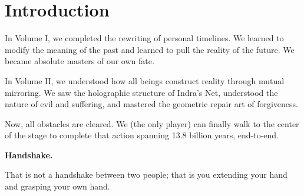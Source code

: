 \section{Introduction}

In Volume I, we completed the rewriting of personal timelines. We learned to modify the meaning of the past and learned to pull the reality of the future. We became absolute masters of our own fate.

In Volume II, we understood how all beings construct reality through mutual mirroring. We saw the holographic structure of Indra's Net, understood the nature of evil and suffering, and mastered the geometric repair art of forgiveness.

Now, all obstacles are cleared. We (the only player) can finally walk to the center of the stage to complete that action spanning 13.8 billion years, end-to-end.

\textbf{Handshake.}

That is not a handshake between two people; that is you extending your hand and grasping your own hand.


